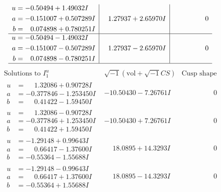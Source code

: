 \documentclass[1p]{elsarticle_modified}
\theoremstyle{definition}
\newcommand{\I}{\sqrt{-1}}
\begin{document}
$$\begin{array}{c|c|c}
\begin{aligned}
u &= -0.50494 + 1.49032 I \\
a &= -0.151007 + 0.507289 I \\
b &= \phantom{-}0.074898 + 0.780251 I\end{aligned}
 & \phantom{-}1.27937 + 2.65970 I & \phantom{-0.000000 } 0 \\ \hline\begin{aligned}
u &= -0.50494 - 1.49032 I \\
a &= -0.151007 - 0.507289 I \\
b &= \phantom{-}0.074898 - 0.780251 I\end{aligned}
 & \phantom{-}1.27937 - 2.65970 I & \phantom{-0.000000 } 0\\
 \hline 
 \end{array}$$\newpage$$\begin{array}{c|c|c}  
\text{Solutions to }I^u_{1}& \I (\text{vol} + \sqrt{-1}CS) & \text{Cusp shape}\\
 \hline 
\begin{aligned}
u &= \phantom{-}1.32086 + 0.90728 I \\
a &= -0.377846 - 1.253450 I \\
b &= \phantom{-}0.41422 - 1.59450 I\end{aligned}
 & -10.50430 - 7.26761 I & \phantom{-0.000000 } 0 \\ \hline\begin{aligned}
u &= \phantom{-}1.32086 - 0.90728 I \\
a &= -0.377846 + 1.253450 I \\
b &= \phantom{-}0.41422 + 1.59450 I\end{aligned}
 & -10.50430 + 7.26761 I & \phantom{-0.000000 } 0 \\ \hline\begin{aligned}
u &= -1.29148 + 0.99643 I \\
a &= \phantom{-}0.66417 - 1.37600 I \\
b &= -0.55364 - 1.55688 I\end{aligned}
 & \phantom{-}18.0895 + 14.3293 I & \phantom{-0.000000 } 0 \\ \hline\begin{aligned}
u &= -1.29148 - 0.99643 I \\
a &= \phantom{-}0.66417 + 1.37600 I \\
b &= -0.55364 + 1.55688 I\end{aligned}
 & \phantom{-}18.0895 - 14.3293 I & \phantom{-0.000000 } 0 \\ \hline\begin{aligned}

\end{aligned}
\end{array}$$
\end{document}
